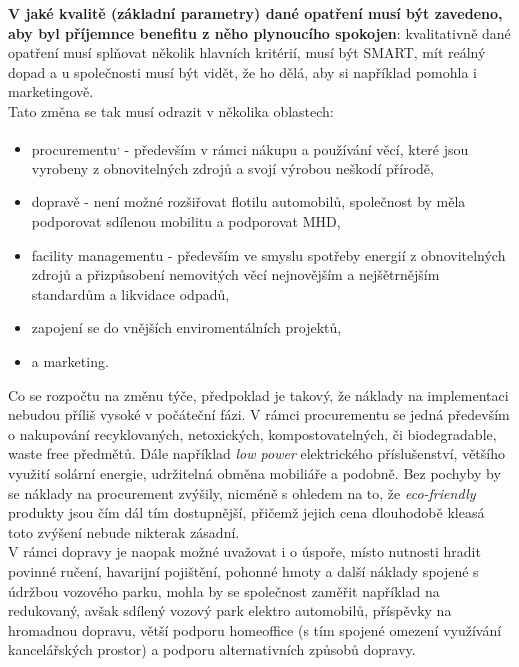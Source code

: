 \textbf{V jaké kvalitě (základní parametry) dané opatření musí být zavedeno, aby byl příjemnce benefitu z něho plynoucího spokojen}: kvalitativně dané opatření musí splňovat několik hlavních kritérií, musí být SMART, mít reálný dopad a u společnosti musí být vidět, že ho dělá, aby si například pomohla i marketingově.\\

Tato změna se tak musí odrazit v několika oblastech:

\begin{itemize}
	\item procurementu\textsuperscript{,} - především v rámci nákupu a používání věcí, které jsou vyrobeny z obnovitelných zdrojů a svojí výrobou neškodí přírodě,
	\item dopravě - není možné rozšiřovat flotilu automobilů, společnost by měla podporovat sdílenou mobilitu a podporovat MHD,
	\item facility managementu - především ve smyslu spotřeby energií z obnovitelných zdrojů a přizpůsobení nemovitých věcí nejnovějším a nejšětrnějším standardům a likvidace odpadů,
	\item zapojení se do vnějších enviromentálních projektů,
	\item a marketing.
\end{itemize}

Co se rozpočtu na změnu týče, předpoklad je takový, že náklady na implementaci nebudou příliš vysoké v počáteční fázi. V rámci procurementu se jedná především o nakupování recyklovaných, netoxických, kompostovatelných, či biodegradable, waste free předmětů. Dále například \textit{low power} elektrického příslušenství, většího využití solární energie, udržitelná obměna mobiliáře a podobně. Bez pochyby by se náklady na procurement zvýšily, nicméně s ohledem na to, že \textit{eco-friendly} produkty jsou čím dál tím dostupnější, přičemž jejich cena dlouhodobě kleasá toto zvýšení nebude nikterak zásadní.\\

V rámci dopravy je naopak možné uvažovat i o úspoře, místo nutnosti hradit povinné ručení, havarijní pojištění, pohonné hmoty a další náklady spojené s údržbou vozového parku, mohla by se společnost zaměřit například na redukovaný, avšak sdílený vozový park elektro automobilů, příspěvky na hromadnou dopravu, větší podporu homeoffice (s tím spojené omezení využívání kancelářských prostor) a podporu alternativních způsobů dopravy.\\

